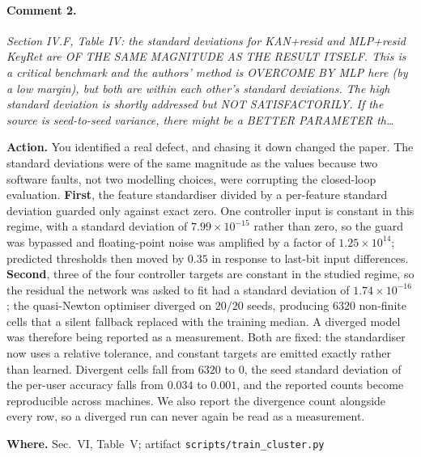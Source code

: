 \documentclass[10pt]{article}
\newcommand{\rev}[1]{\par\medskip\noindent\textit{#1}\par\smallskip}
\newcommand{\act}[2]{\noindent\textbf{Action.} #1\par\noindent\textbf{Where.} #2\par}
\begin{document}
\paragraph{Comment 2.}
\rev{Section IV.F, Table IV: the standard deviations for KAN+resid and MLP+resid KeyRet are OF THE SAME MAGNITUDE AS THE RESULT ITSELF. This is a critical benchmark and the authors' method is OVERCOME BY MLP here (by a low margin), but both are within each other's standard deviations. The high standard deviation is shortly addressed but NOT SATISFACTORILY. If the source is seed-to-seed variance, there might be a BETTER PARAMETER th\dots}
\act{You identified a real defect, and chasing it down changed the paper. The standard deviations were of the same magnitude as the values because two software faults, not two modelling choices, were corrupting the closed-loop evaluation. \textbf{First}, the feature standardiser divided by a per-feature standard deviation guarded only against exact zero. One controller input is constant in this regime, with a standard deviation of $7.99\times10^{-15}$ rather than zero, so the guard was bypassed and floating-point noise was amplified by a factor of $1.25\times10^{14}$; predicted thresholds then moved by $0.35$ in response to last-bit input differences. \textbf{Second}, three of the four controller targets are constant in the studied regime, so the residual the network was asked to fit had a standard deviation of $1.74\times10^{-16}$; the quasi-Newton optimiser diverged on $20/20$ seeds, producing $6320$ non-finite cells that a silent fallback replaced with the training median. A diverged model was therefore being reported as a measurement. Both are fixed: the standardiser now uses a relative tolerance, and constant targets are emitted exactly rather than learned. Divergent cells fall from $6320$ to $0$, the seed standard deviation of the per-user accuracy falls from $0.034$ to $0.001$, and the reported counts become reproducible across machines. We also report the divergence count alongside every row, so a diverged run can never again be read as a measurement.}{Sec.~VI, Table~V; artifact \texttt{scripts/train\_cluster.py}}
\end{document}
